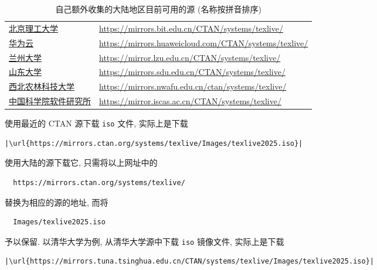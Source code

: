 \begin{table}
  \centering
  \caption{自己额外收集的大陆地区目前可用的源 (名称按拼音排序)}\label{tab:appendix:mirror-addition}
  \begin{tabular}{*{2}{l}}
    \hline\hline
    \href{https://mirrors.bit.edu.cn/web/}{北京理工大学}
    & \url{https://mirrors.bit.edu.cn/CTAN/systems/texlive/}\\
    \href{https://mirrors.huaweicloud.com/}{华为云}
    & \url{https://mirrors.huaweicloud.com/CTAN/systems/texlive/}\\
    \href{https://mirror.lzu.edu.cn/}{兰州大学}
    & \url{https://mirror.lzu.edu.cn/CTAN/systems/texlive/}\\
    \href{https://mirrors.sdu.edu.cn/}{山东大学}
    & \url{https://mirrors.sdu.edu.cn/CTAN/systems/texlive/}\\
    \href{https://mirrors.nwafu.edu.cn/}{西北农林科技大学}
    & \url{https://mirrors.nwafu.edu.cn/ctan/systems/texlive/}\\
    \href{https://mirror.iscas.ac.cn/}{中国科学院软件研究所}
    & \url{https://mirror.iscas.ac.cn/CTAN/systems/texlive/}\\
    \hline\hline
  \end{tabular}
\end{table}

使用最近的 CTAN 源下载 \texttt{iso} 文件,
实际上是下载
\begin{lstlisting}[escapechar = |]
  |\url{https://mirrors.ctan.org/systems/texlive/Images/texlive2025.iso}|
\end{lstlisting}
使用大陆的源下载它,
只需将以上网址中的
\begin{lstlisting}
  https://mirrors.ctan.org/systems/texlive/
\end{lstlisting}
替换为相应的源的地址,
而将
\begin{lstlisting}
  Images/texlive2025.iso
\end{lstlisting}
予以保留.
以清华大学为例,
从清华大学源中下载 \texttt{iso} 镜像文件,
实际上是下载
\begin{lstlisting}[escapechar = |]
  |\url{https://mirrors.tuna.tsinghua.edu.cn/CTAN/systems/texlive/Images/texlive2025.iso}|
\end{lstlisting}

